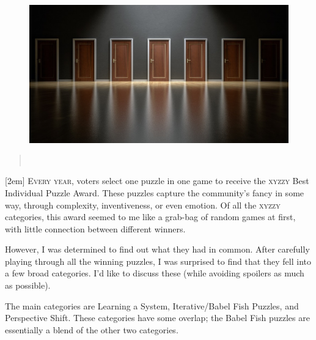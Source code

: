 \begin{figure}[h]                                                           
  \includegraphics[width=\linewidth]{./media/images/doors}%
  \label{fig:doors}%
\end{figure}                                                                
\begin{quotation} 
\noindent{}\\[.5mm]

\hfill{}
\end{quotation}
\pagebreak
{}[2em]
\lettrine[lines=3]{\color{BrickRed}E}{\enspace very year}, voters select one puzzle in one game to receive the \textsc{xyzzy} Best Individual Puzzle Award. These puzzles capture the community’s fancy in some way, through complexity, inventiveness, or even emotion. Of all the \textsc{xyzzy} categories, this award seemed to me like a grab-bag of random games at first, with little connection between different winners.

However, I was determined to find out what they had in common. After carefully playing through all the winning puzzles, I was surprised to find that they fell into a few broad categories. I’d like to discuss these (while avoiding spoilers as much as possible). 

The main categories are Learning a System, Iterative/Babel Fish Puzzles, and Perspective Shift. These categories have some overlap; the Babel Fish puzzles are essentially a blend of the other two categories.

